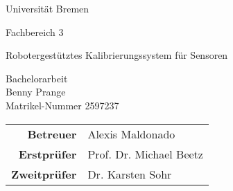 
\pagestyle{empty} %

\clearscrheadings\clearscrplain
\begin{center}
\begin{Huge}
Universität Bremen\\
\vspace{3mm}
\end{Huge}
{\Large Fachbereich 3}\\

\vspace{20mm}
\begin{Large}
Robotergestütztes Kalibrierungssystem für Sensoren\\
\end{Large}
\vspace{8mm}
Bachelorarbeit\\
\vspace{0.4cm}
\vspace{2 cm}
Benny Prange \\
Matrikel-Nummer 2597237\\
\vspace{8cm}
\begin{tabular}{rl}
{\bfseries Betreuer} & Alexis Maldonado\\
{\bfseries Erstprüfer}&Prof. Dr. Michael Beetz\\
{\bfseries Zweitprüfer}&Dr. Karsten Sohr\\
\end{tabular}

\end{center}
\clearpage


\pagestyle{useheadings} %

\tableofcontents %
\listoffigures %
\listoftables %
\clearpage













